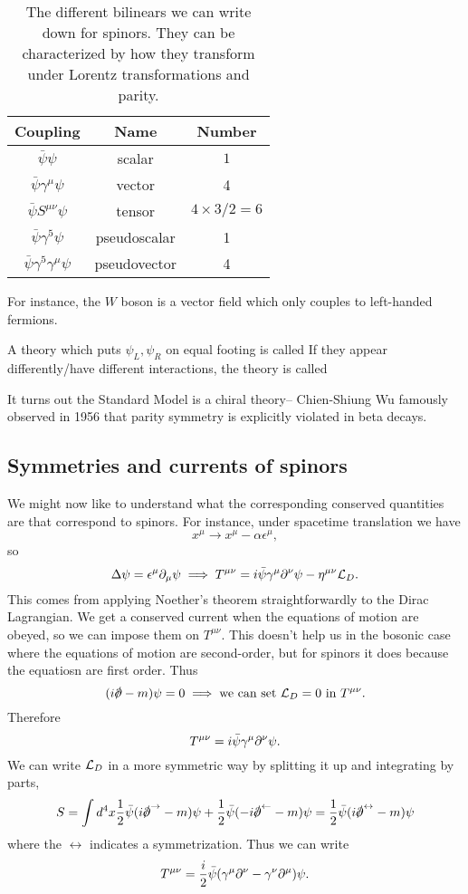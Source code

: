 \begin{table}[]
    \centering
    \begin{tabular}{|c|c|c|}
        \hline
        Coupling & Name & Number \\ \hline
         $\bar\psi \psi$ & scalar & $1$\\ \hline
         $\bar \psi \gamma^\mu \psi$ & vector & 4\\ \hline
         $\bar \psi S^{\mu\nu}\psi$ & tensor & $4\times 3/2=6$\\ \hline
         $\bar \psi \gamma^5 \psi$ & pseudoscalar & 1\\ \hline
         $\bar \psi \gamma^5 \gamma^\mu \psi$ & pseudovector & 4\\ \hline
    \end{tabular}
    \caption{The different bilinears we can write down for spinors. They can be characterized by how they transform under Lorentz transformations and parity.}
    \label{tab:bilinears}
\end{table}

For instance, the $W$ boson is a vector field which only couples to left-handed fermions. 
\begin{defn}
A theory which puts $\psi_L,\psi_R$ on equal footing is called  If they appear differently/have different interactions, the theory is called 
\end{defn}
It turns out the Standard Model is a chiral theory-- Chien-Shiung Wu famously observed in 1956 that parity symmetry is explicitly violated in beta decays.

\subsection*{Symmetries and currents of spinors} We might now like to understand what the corresponding conserved quantities are that correspond to spinors. For instance, under spacetime translation we have
$$x^\mu \to x^\mu -\alpha \epsilon^\mu,$$
so
$$\Delta \psi=\epsilon^\mu \partial_\mu \psi \implies T^{\mu\nu}=i \bar \psi \gamma^\mu \partial^\nu \psi-\eta^{\mu\nu}\mathcal L_D.$$
This comes from applying Noether's theorem straightforwardly to the Dirac Lagrangian.
We get a conserved current when the equations of motion are obeyed, so we can impose them on $T^{\mu\nu}$. This doesn't help us in the bosonic case where the equations of motion are second-order, but for spinors it does because the equatiosn are first order. Thus
$$(i\slashed{\p}-m)\psi=0 \implies \text{we can set }\cL_D=0\text{ in }T^{\mu\nu}.$$
Therefore
$$T^{\mu\nu}=i\bar \psi \gamma^\mu \partial^\nu \psi.$$
We can write $\mathcal L_D$ in a more symmetric way by splitting it up and integrating by parts,
$$S=\int d^4x \frac{1}{2} \bar \psi(i \slashed{\p}^\rightarrow -m)\psi+\frac{1}{2}\bar \psi(-i \slashed{\p}^\leftarrow - m)\psi = \frac{1}{2} \bar \psi (i \slashed{\p}^\leftrightarrow - m)\psi$$
where the $\leftrightarrow$ indicates a symmetrization. Thus we can write
$$T^{\mu\nu}=\frac{i}{2}\bar\psi (\gamma^\mu \partial^\nu- \gamma^\nu \partial^\mu)\psi.$$